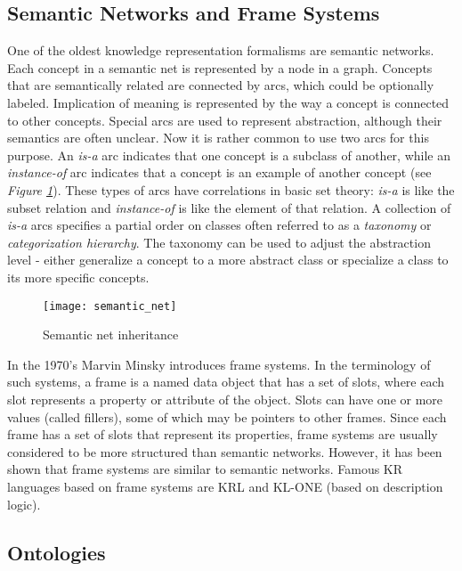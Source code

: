 \subsection{Semantic Networks and Frame Systems}
One of the oldest knowledge representation formalisms are semantic networks. Each concept in a semantic net is represented by a node in a graph. Concepts that are
semantically related are connected by arcs, which could be optionally labeled. Implication of meaning is represented by the way a concept is connected to other concepts. Special arcs are used to represent abstraction, although their semantics are often unclear. Now it is rather common to use two arcs for this purpose. An \textit{is-a} arc indicates that one concept is a subclass of another, while an \textit{instance-of} arc indicates that a concept is an example of another concept (see \textit{Figure \ref{fig:semantic_net}}). These types of arcs have correlations in basic set theory: \textit{is-a} is like the subset relation and \textit{instance-of} is like the element of that relation.
A collection of \textit{is-a} arcs specifies a partial order on classes often referred to as a \textit{taxonomy} or \textit{categorization hierarchy}. The taxonomy can be used to adjust the abstraction level - either generalize a concept to a more abstract class or specialize a class to its more specific concepts.

\begin{figure}[h!]
    \centering
    \texttt{[image: semantic\_net]}
    \caption{Semantic net inheritance}
    \label{fig:semantic_net}
\end{figure}

In the 1970's Marvin Minsky introduces frame systems. In the terminology of such systems, a frame is a named data object that has a set of slots, where each slot
represents a property or attribute of the object. Slots can have one or more values (called fillers), some of which may be pointers to other frames. Since each frame has a set of slots that represent its properties, frame systems are usually considered to be
more structured than semantic networks. However, it has been shown that frame systems are similar to semantic networks. Famous KR languages based on frame systems are KRL and KL-ONE (based on description logic). 

\subsection{Ontologies}


